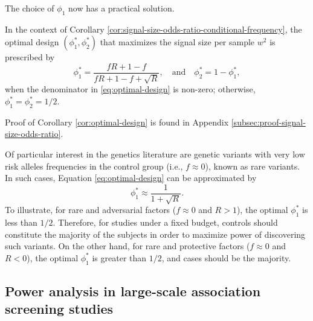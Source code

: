The choice of $\phi_1$ now has a practical solution.

\begin{corollary} \label{cor:optimal-design}
In the context of Corollary \ref{cor:signal-size-odds-ratio-conditional-frequency},
the optimal design $(\phi^*_1, \phi^*_2)$ that maximizes the signal size per sample $w^2$ is prescribed by
\begin{equation} \label{eq:optimal-design}
    \phi_1^* = \frac{fR+1-f}{fR+1-f+\sqrt{R}}, \quad\text{and}\quad 
    \phi_2^* = 1-\phi_1^*,
\end{equation}
when the denominator in \eqref{eq:optimal-design} is non-zero; otherwise, $\phi_1^*=\phi_2^*=1/2$.
\end{corollary} 

Proof of Corollary \ref{cor:optimal-design} is found in Appendix \ref{subsec:proof-signal-size-odds-ratio}. 

Of particular interest in the genetics literature are genetic variants with very low risk alleles frequencies in the control group (i.e., $f\approx 0$), known as rare variants.
In such cases, Equation \eqref{eq:optimal-design} can be approximated by
\begin{equation} \label{eq:optimal-design-approx}
    \phi_1^* \approx \frac{1}{1 + \sqrt{R}}.
\end{equation}
To illustrate, for rare and adversarial factors ($f\approx0$ and $R>1$), the optimal $\phi_1^*$ is less than $1/2$.
Therefore, for studies under a fixed budget, controls should constitute the majority of the subjects in order to maximize power of discovering such variants.
On the other hand, for rare and protective factors ($f\approx0$ and $R<0$), the optimal $\phi_1^*$ is greater than $1/2$, and cases should be the majority.

\subsection{Power analysis in large-scale association screening studies}




